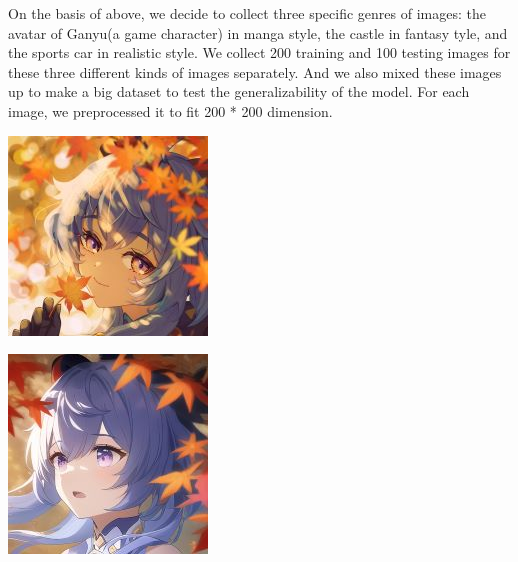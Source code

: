 \documentclass[conference]{IEEEtran}
\begin{document}
On the basis of above, we decide to collect three specific genres of images: the avatar of Ganyu(a game character) in manga style, the castle in fantasy tyle, and the sports car in realistic style.
We collect 200 training and 100 testing images for these three different kinds of images separately. And we also mixed these images up to make a big dataset to test the generalizability of the model.
For each image, we preprocessed it to fit 200 * 200 dimension.

\begin{center}
  \begin{minipage}{0.24\textwidth}
    \centering
      \begin{minipage}{.5\textwidth}
        \centering
        \includegraphics[width=0.9\linewidth]{ganyu1.jpg}
        \label{fig:test1}
      \end{minipage}%
      \begin{minipage}{.5\textwidth}
        \centering
        \includegraphics[width=0.9\linewidth]{ganyu2.jpg}

\end{minipage}
\end{minipage}
\end{center}
\end{document}

